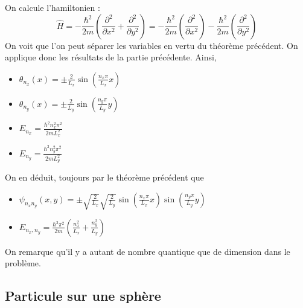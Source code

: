 \documentclass[french]{yLectureNote}
\newcommand{\HH}{\hat{H}}
\newcommand{\hb}{\hbar}
\begin{document}
On calcule l'hamiltonien : \[\HH = -\frac{\hb^2}{2m}(\frac{\partial^2}{\partial x^2} + \frac{\partial^2}{\partial y^2}) = -\frac{\hb^2}{2m}(\frac{\partial^2}{\partial x^2}) -\frac{\hb^2}{2m}(\frac{\partial^2}{\partial y^2})\]
On voit que l'on peut séparer les variables en vertu du théorème précédent. On applique donc les résultats de la partie précédente. Ainsi,
\begin{itemize}
 \item \(\theta_{n_x}(x) = \pm \frac{2}{L_x}\sin(\frac{n_x\pi}{L_x}x)\)
  \item \(\theta_{n_y}(x) = \pm \frac{2}{L_y}\sin(\frac{n_y\pi}{L_y}y)\)
  \item \(E_{n_x} = \frac{\hb^2n_x^2\pi^2}{2mL_x^2}\)
  \item \(E_{n_y} = \frac{\hb^2n_y^2\pi^2}{2mL_y^2}\)
\end{itemize}
On en déduit, toujours par le théorème précédent que
\begin{itemize}
\item \(\psi_{n_xn_y}(x,y) = \pm \sqrt{\frac{2}{L_x}}\sqrt{\frac{2}{L_y}}\sin(\frac{n_x\pi}{L_x}x)\sin(\frac{n_y\pi}{L_y}y)\)
\item \(E_{n_x,n_y} = \frac{\hb^2\pi^2}{2m}(\frac{n_x^2}{L_x}+\frac{n_y^2}{L_y})\)
\end{itemize}
On remarque qu'il y a autant de nombre quantique que de dimension dans le problème.
\subsection{Particule sur une sphère}
\end{document}
